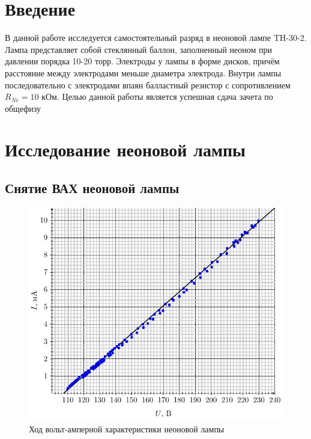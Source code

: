 





\tableofcontents
\newpage

\section*{Введение}
\label{sec:input}
В данной работе исследуется самостоятельный разряд в неоновой лампе TH-30-2. Лампа представляет собой стеклянный баллон, заполненный неоном при давлении порядка 10-20 торр. Электроды у лампы в форме дисков, причём расстояние между электродами меньше диаметра электрода. Внутри лампы последовательно с электродами впаян балластный резистор с сопротивлением $R_{Ne}=10$ кОм.  
Целью данной работы является успешная сдача зачета по общефизу

\newpage
\section{Исследование неоновой лампы}
\subsection{Снятие ВАХ неоновой лампы}



\newpage





\begin{figure}[H]
	\centering
	\includegraphics[width=\textwidth]{vax}
	\caption{Ход вольт-амперной характеристики неоновой лампы}
	\label{fig:figure1}
\end{figure}

